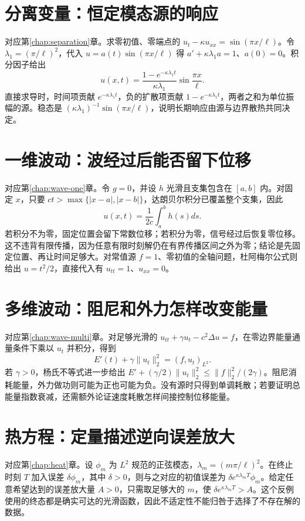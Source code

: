 \documentclass[UTF8,12pt,a4paper,fontset=fandol]{ctexbook}
\begin{document}
\section{分离变量：恒定模态源的响应}
对应第\ref{chap:separation}章。求零初值、零端点的 $u_t-\kappa u_{xx}=\sin(\pi x/\ell)$。令 $\lambda_1=(\pi/\ell)^2$，代入 $u=a(t)\sin(\pi x/\ell)$ 得 $a'+\kappa\lambda_1a=1$、$a(0)=0$。积分因子给出
\[
 u(x,t)=\frac{1-e^{-\kappa\lambda_1t}}{\kappa\lambda_1}\sin\frac{\pi x}{\ell}.
\]
直接求导时，时间项贡献 $e^{-\kappa\lambda_1t}$，负的扩散项贡献 $1-e^{-\kappa\lambda_1t}$，两者之和为单位振幅的源。稳态是 $(\kappa\lambda_1)^{-1}\sin(\pi x/\ell)$，说明长期响应由源与边界散热共同决定。

\section{一维波动：波经过后能否留下位移}
对应第\ref{chap:wave-one}章。令 $g=0$，并设 $h$ 光滑且支集包含在 $[a,b]$ 内。对固定 $x$，只要 $ct>\max\{|x-a|,|x-b|\}$，达朗贝尔积分已覆盖整个支集，因此
\[
 u(x,t)=\frac1{2c}\int_a^b h(s)ds.
\]
若积分不为零，固定位置会留下常数位移；若积分为零，信号经过后恢复零位移。这不违背有限传播，因为任意有限时刻解仍在有界传播区间之外为零；结论是先固定位置、再让时间足够大。对常值源 $f=1$、零初值的全轴问题，杜阿梅尔公式则给出 $u=t^2/2$，直接代入有 $u_{tt}=1$、$u_{xx}=0$。

\section{多维波动：阻尼和外力怎样改变能量}
对应第\ref{chap:wave-multi}章。对足够光滑的 $u_{tt}+\gamma u_t-c^2\Delta u=f$，在零边界能量通量条件下乘以 $u_t$ 并积分，得到
\[
 E'(t)+\gamma\|u_t\|_2^2=(f,u_t)_{L^2}.
\]
若 $\gamma>0$，杨氏不等式进一步给出 $E'+(\gamma/2)\|u_t\|_2^2\le\|f\|_2^2/(2\gamma)$。阻尼消耗能量，外力做功则可能为正也可能为负。没有源时只得到单调耗散；若要证明总能量指数衰减，还需额外论证速度耗散怎样间接控制位移能量。

\section{热方程：定量描述逆向误差放大}
对应第\ref{chap:heat}章。设 $\phi_m$ 为 $L^2$ 规范的正弦模态，$\lambda_m=(m\pi/\ell)^2$。在终止时刻 $T$ 加入误差 $\delta\phi_m$，其中 $\delta>0$，则与之对应的初值误差为 $\delta e^{\kappa\lambda_mT}\phi_m$。给定任意希望达到的误差放大量 $A>0$，只需取足够大的 $m$，使 $\delta e^{\kappa\lambda_mT}>A$。这个反例使用的终态都是确实可达的光滑函数，因此不适定性不能归咎于选择了不存在解的数据。
\end{document}
